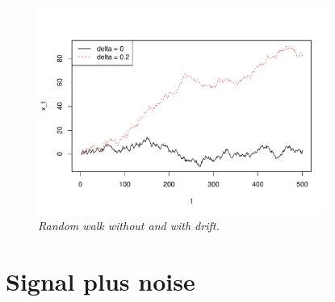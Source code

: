 \documentclass{article}
\begin{document}
\begin{figure}[ht]
\centering
\includegraphics[width=0.85\textwidth]{fig/rw-1.pdf}
\caption{\it Random walk without and with drift.}
\label{fig:rw}
\end{figure}

\section{Signal plus noise}
\end{document}
